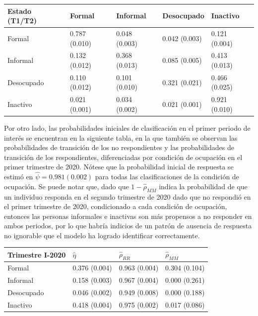 \documentclass[
  12pt,
  spanish,
]{book}
\begin{document}
\begin{longtable}[]{@{}lllll@{}}
\toprule
Estado (T1/T2) & Formal & Informal & Desocupado & Inactivo \\
\midrule
\endhead
Formal & 0.787 (0.010) & 0.048 (0.003) & 0.042 (0.003) & 0.121 (0.004) \\
Informal & 0.132 (0.012) & 0.368 (0.013) & 0.085 (0.005) & 0.413 (0.013) \\
Desocupado & 0.110 (0.012) & 0.101 (0.010) & 0.321 (0.021) & 0.466 (0.025) \\
Inactivo & 0.021 (0.001) & 0.034 (0.002) & 0.021 (0.001) & 0.921 (0.010) \\
\bottomrule
\end{longtable}

Por otro lado, las probabilidades iniciales de clasificación en el primer periodo de interés se encuentran en la siguiente tabla, en la que también se observan las probabilidades de transición de los no respondientes y las probabilidades de transición de los respondientes, diferenciadas por condición de ocupación en el primer trimestre de 2020. Nótese que la probabilidad inicial de respuesta se estimó en \(\hat{\psi}=0.981 (0.002)\) para todas las clasificaciones de la condición de ocupación. Se puede notar que, dado que \(1-\hat{\rho}_{MM}\) indica la probabilidad de que un individuo responda en el segundo trimestre de 2020 dado que no respondió en el primer trimestre de 2020, condicionado a cada condición de ocupación, entonces las personas informales e inactivas son más propensos a no responder en ambos periodos, por lo que habría indicios de un patrón de ausencia de respuesta no ignorable que el modelo ha logrado identificar correctamente.

\begin{longtable}[]{@{}llll@{}}
\toprule
Trimestre I-2020 & \(\hat{\eta}\) & \(\hat{\rho}_{RR}\) & \(\hat{\rho}_{MM}\) \\
\midrule
\endhead
Formal & 0.376 (0.004) & 0.963 (0.004) & 0.304 (0.104) \\
Informal & 0.158 (0.003) & 0.967 (0.004) & 0.000 (0.261) \\
Desocupado & 0.046 (0.002) & 0.949 (0.008) & 0.000 (0.188) \\
Inactivo & 0.418 (0.004) & 0.975 (0.002) & 0.017 (0.086) \\
\bottomrule
\end{longtable}
\end{document}
